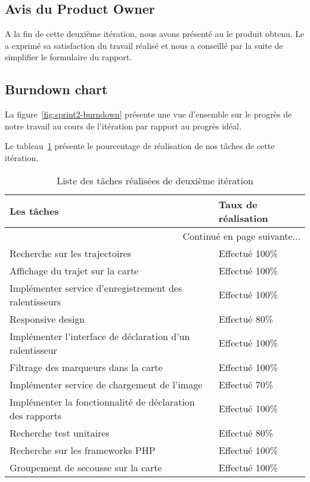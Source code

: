 \subsection{Avis du Product Owner}

A la fin de cette deuxième itération, nous avons présenté au  le produit obtenu. Le  a exprimé sa
satisfaction du travail réalisé et nous a conseillé par la suite de simplifier
le formulaire du rapport.

\subsection{Burndown chart}

La figure~\ref{fig:sprint2-burndown} présente une vue d'ensemble sur le progrès
de notre travail au cours de l'itération par rapport au progrès idéal.



Le tableau~\ref{tab:sprint2-evaluation} présente le pourcentage de
réalisation de nos tâches de cette itération.
\begin{center}
    \begin{longtable}{| l | l |}
        \caption{Liste des tâches réalisées de deuxième itération}
\label{tab:sprint2-evaluation} \\

        \hline
        \textbf{Les tâches} & \textbf{Taux de réalisation} \\ \hline
        \endhead

        \hline \multicolumn{2}{|r|}{{Continué en page suivante$\dotsc$}} \\ \hline
        \endfoot

        \hline \hline
        \endlastfoot

        \hline
Recherche sur les trajectoires & Effectué 100\% \\ \hline
Affichage du trajet sur la carte & Effectué 100\% \\ \hline
Implémenter service d'enregistrement des ralentisseurs & Effectué 100\% \\ \hline
Responsive design & Effectué 80\% \\ \hline
Implémenter l'interface de déclaration d'un ralentisseur & Effectué 100\% \\ \hline
Filtrage des marqueurs dans la carte & Effectué 100\% \\ \hline
Implémenter service de chargement de l'image & Effectué 70\% \\ \hline
Implémenter la fonctionnalité de déclaration des rapports & Effectué 100\% \\ \hline
Recherche test unitaires & Effectué 80\% \\ \hline
Recherche sur les frameworks PHP & Effectué 100\% \\ \hline
Groupement de secousse sur la carte & Effectué 100\% \\ \hline
    \end{longtable}
\end{center}

